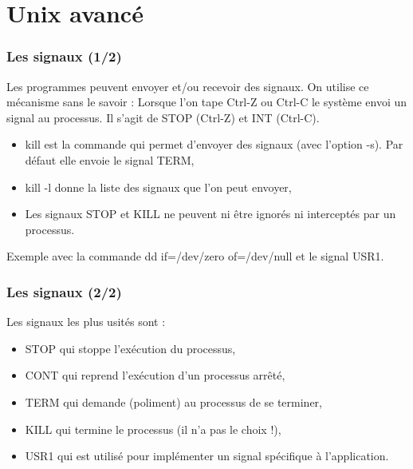 \documentclass[handout,10pt]{beamer}
\begin{document}
%


\section{Unix avancé}
\frame
{
    \frametitle{Les signaux (1/2)}

    Les programmes peuvent envoyer et/ou recevoir des signaux. On utilise ce mécanisme sans le savoir :
    Lorsque l'on tape Ctrl-Z ou Ctrl-C le système envoi un signal au processus.
    Il s'agit de STOP (Ctrl-Z) et INT (Ctrl-C).

    \begin{itemize}
        \item {\ttfamily kill} est la commande qui permet d'envoyer des signaux (avec l'option {\ttfamily -s}). Par défaut elle envoie le signal {\ttfamily TERM},
        \item {\ttfamily kill -l} donne la liste des signaux que l'on peut envoyer,
        \item Les signaux {\ttfamily STOP} et {\ttfamily KILL} ne peuvent ni être ignorés ni interceptés par un processus.
    \end{itemize}

    Exemple avec la commande {\ttfamily dd if=/dev/zero of=/dev/null} et le signal {\ttfamily USR1}.
}


\frame
{
    \frametitle{Les signaux (2/2)}

    Les signaux les plus usités sont :

    \begin{itemize}
        \item {\ttfamily STOP} qui stoppe l'exécution du processus,
        \item {\ttfamily CONT} qui reprend l'exécution d'un processus arrêté,
        \item {\ttfamily TERM} qui demande (poliment) au processus de se terminer,
        \item {\ttfamily KILL} qui termine le processus (il n'a pas le choix !),
        \item {\ttfamily USR1} qui est utilisé pour implémenter un signal spécifique à l'application.
    \end{itemize}
}
\end{document}
